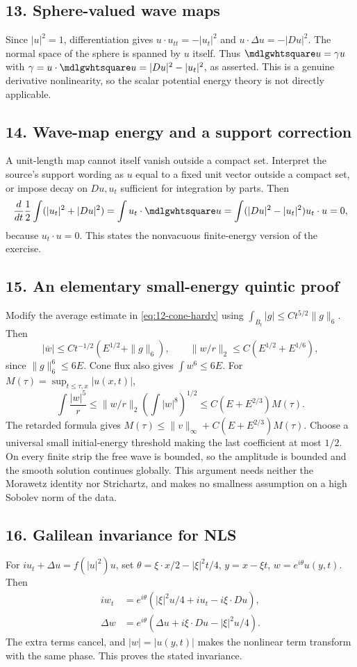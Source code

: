 \subsection*{13. Sphere-valued wave maps}
Since $|u|^2=1$, differentiation gives
$u\cdot u_{tt}=-|u_t|^2$ and $u\cdot\Delta u=-|Du|^2$.
The normal space of the sphere is spanned by $u$ itself. Thus
$\PDEWave u=\gamma u$ with
$\gamma=u\cdot\PDEWave u=|Du|^2-|u_t|^2$, as asserted.
This is a genuine derivative nonlinearity, so the scalar potential
energy theory is not directly applicable.

\subsection*{14. Wave-map energy and a support correction}
A unit-length map cannot itself vanish outside a compact set.
Interpret the source's support wording as $u$ equal to a fixed unit
vector outside a compact set, or impose decay on $Du,u_t$ sufficient
for integration by parts. Then
\[
 \frac d{dt}\frac12\int(|u_t|^2+|Du|^2)
 =\int u_t\cdot\PDEWave u
 =\int(|Du|^2-|u_t|^2)u_t\cdot u=0,
\]
because $u_t\cdot u=0$. This states the nonvacuous finite-energy
version of the exercise.

\subsection*{15. An elementary small-energy quintic proof}
Modify the average estimate in \eqref{eq:12-cone-hardy} using
$\int_{B_t}|g|\le Ct^{5/2}\|g\|_6$. Then
\[
 |\overline w|\le Ct^{-1/2}(E^{1/2}+\|g\|_6),\qquad
 \|w/r\|_2\le C(E^{1/2}+E^{1/6}),
\]
since $\|g\|_6^6\le6E$. Cone flux also gives $\int w^6\le6E$.
For $M(\tau)=\sup_{t\le\tau,x}|u(x,t)|$,
\[
 \int\frac{|w|^5}{r}
 \le\|w/r\|_2\left(\int|w|^8\right)^{1/2}
 \le C(E+E^{2/3})M(\tau).
\]
The retarded formula gives
$M(\tau)\le\|v\|_\infty+C(E+E^{2/3})M(\tau)$.
Choose a universal small initial-energy threshold making the last
coefficient at most $1/2$. On every finite strip the free wave is
bounded, so the amplitude is bounded and the smooth solution
continues globally. This argument needs neither the Morawetz identity
nor Strichartz, and makes no smallness assumption on a high Sobolev
norm of the data.

\subsection*{16. Galilean invariance for NLS}
For $iu_t+\Delta u=f(|u|^2)u$, set
$\theta=\xi\cdot x/2-|\xi|^2t/4$, $y=x-\xi t$,
$w=e^{i\theta}u(y,t)$. Then
\[
 \begin{split}
 iw_t&=e^{i\theta}(|\xi|^2u/4+iu_t-i\xi\cdot Du),\\
 \Delta w&=e^{i\theta}(\Delta u+i\xi\cdot Du-|\xi|^2u/4).
 \end{split}
\]
The extra terms cancel, and $|w|=|u(y,t)|$ makes the nonlinear
term transform with the same phase. This proves the stated invariance.

